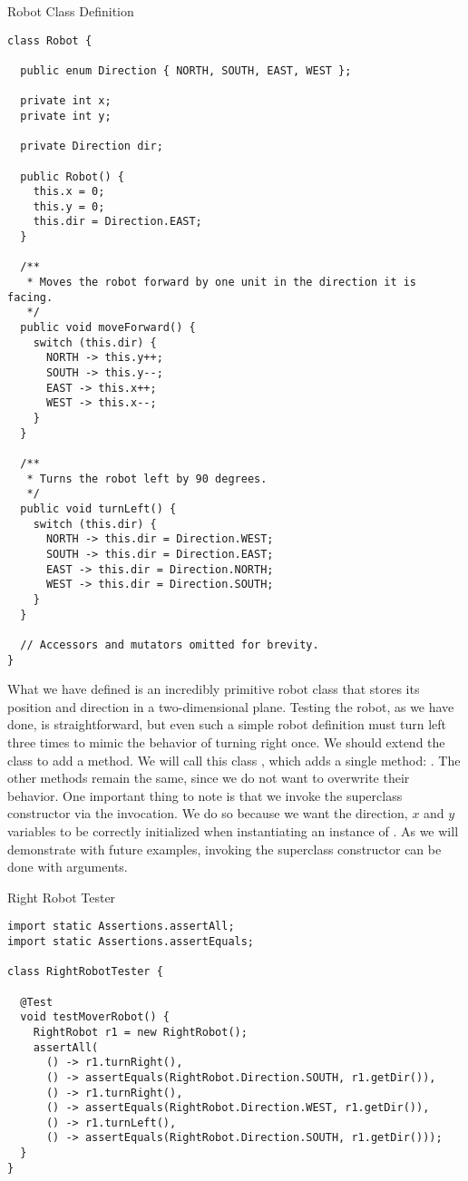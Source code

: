 \begin{cl}{Robot Class Definition}
\begin{lstlisting}[language=MyJava]
class Robot {

  public enum Direction { NORTH, SOUTH, EAST, WEST };

  private int x;
  private int y;

  private Direction dir;

  public Robot() {
    this.x = 0;
    this.y = 0;
    this.dir = Direction.EAST;
  }

  /**
   * Moves the robot forward by one unit in the direction it is facing.
   */
  public void moveForward() {
    switch (this.dir) {
      NORTH -> this.y++;
      SOUTH -> this.y--;
      EAST -> this.x++;
      WEST -> this.x--;
    }
  }

  /**
   * Turns the robot left by 90 degrees.
   */
  public void turnLeft() {
    switch (this.dir) {
      NORTH -> this.dir = Direction.WEST;
      SOUTH -> this.dir = Direction.EAST;
      EAST -> this.dir = Direction.NORTH;
      WEST -> this.dir = Direction.SOUTH;
    }
  }

  // Accessors and mutators omitted for brevity.
}
\end{lstlisting}
\end{cl}

What we have defined is an incredibly primitive robot class that stores its position and direction in a two-dimensional plane. Testing the robot, as we have done, is straightforward, but even such a simple robot definition must turn left three times to mimic the behavior of turning right once. We should extend the  class to add a  method. We will call this class , which adds a single method: . The other methods remain the same, since we do not want to overwrite their behavior. One important thing to note is that we invoke the superclass constructor via the  invocation. We do so because we want the direction, $x$ and $y$ variables to be correctly initialized when instantiating an instance of . As we will demonstrate with future examples, invoking the superclass constructor can be done with arguments.

\begin{cl}{Right Robot Tester}
\begin{lstlisting}[language=MyJava]
import static Assertions.assertAll;
import static Assertions.assertEquals;

class RightRobotTester {

  @Test
  void testMoverRobot() {
    RightRobot r1 = new RightRobot();
    assertAll(
      () -> r1.turnRight(),
      () -> assertEquals(RightRobot.Direction.SOUTH, r1.getDir()),
      () -> r1.turnRight(),
      () -> assertEquals(RightRobot.Direction.WEST, r1.getDir()),
      () -> r1.turnLeft(),
      () -> assertEquals(RightRobot.Direction.SOUTH, r1.getDir()));
  }
}
\end{lstlisting}
\end{cl}

